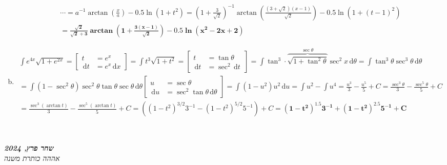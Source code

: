 \documentclass[]{article}
\newcommand\ndoc  {\dotfill \\ \vfil {\begin{center} {\textbf{\textit{שחר פרץ, 2024}} \\ \scriptsize \textit{אההה כותרת משנה}} \end{center}} \vfil	}
\newcommand\tant  {\tan \theta}
\newcommand\sect  {\sec^2}
\newcommand\dx    {\,\mathrm{d}x}
\newcommand\dt    {\,\mathrm{d}t}
\newcommand\dtt   {\,\mathrm{d}\theta}
\newcommand\du    {\,\mathrm{d}u}
\newcommand\pus[2]{\csb{\begin{aligned}
			u &= #1 \\
			\du &= #2
\end{aligned}}}
\newcommand\pts[2]{\csb{\begin{aligned}
t &= #1 \quad \\
\dt &= #2
\end{aligned}}}
\newcommand\ta    {\theta}
\newcommand\op    {^{-1}}
\newcommand\cl [1]    {\left ( #1 \right )}
\newcommand\csb[1]    {\left [ #1 \right ]}
\begin{document}
\begin{enumerate}[a.]
\begin{multline*}
				\cdots = a\op \arctan\cl{\frac{x}{a}} - 0.5\ln(1 + t^2) = \cl{1 + \frac{3}{\sqrt2}}\op \arctan \cl{\frac{(3 + \sqrt2)(x - 1)}{\sqrt2}} - 0.5 \ln (1 + (t - 1)^2) \\
				= \bm{\frac{\sqrt 2}{\sqrt 2 + 3} \arctan \cl{1 + \frac{3(x - 1)}{\sqrt2}} - 0.5\ln(x^2 - 2x + 2)}
			\end{multline*}
		\item 
			\begin{multline*}
				\int e^{4x}\sqrt{1 + e^{2x}} = \pts{e^{x}}{e^{x}\dx} = \int t^3\sqrt{1 + t^2} = \pts{\tant}{\sec^2\dt} = \int \tan^3 \cdot \overbrace{\sqrt{1 + \tan^2 \ta}}^{\sec\ta} \sec^2x \dtt = \int \tan^3\ta\sec^3\ta \dtt \\
				= \int (1 - \sec^2\ta) \sec^2\ta \tan\ta\sec\ta \dtt \pus{\sec \ta}{\sect\tant\dtt} = \int (1 - u^2)u^2 \du = \int u^2 - \int u^4 = \frac{u^3}{3} - \frac{u^5}{5} + C = \frac{\sec^3 \ta}{3} - \frac{\sec^5\ta}{5} +C \\
				= \frac{\sec^3(\arctan t)}{3} - \frac{\sec^5(\arctan t)}{5} + C = ((1 - t^2)^{3 / 2}3\op - (1 - t^2)^{5 / 2}5\op) + C = \bm{(1 - t^2)^{1.5}3\op + (1 - t^2)^{2.5}5\op + C}
			\end{multline*}
		\end{enumerate}
		
		\ndoc
\end{document}
